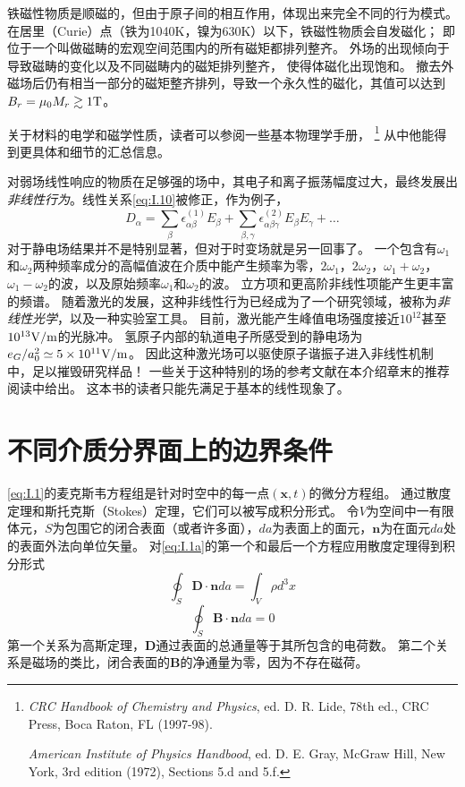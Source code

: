 \documentclass[12pt]{book}
\numberwithin{equation}{chapter}
\numberwithin{figure}{chapter}
\numberwithin{footnote}{page}
\begin{document}
铁磁性物质是顺磁的，但由于原子间的相互作用，体现出来完全不同的行为模式。
在居里（Curie）点（铁为1040K，镍为630K）以下，铁磁性物质会自发磁化；
即位于一个叫做磁畴的宏观空间范围内的所有磁矩都排列整齐。
外场的出现倾向于导致磁畴的变化以及不同磁畴内的磁矩排列整齐，
使得体磁化出现饱和。
撤去外磁场后仍有相当一部分的磁矩整齐排列，导致一个永久性的磁化，其值可以达到$B_r=\mu_0 M_r\gtrsim 1 {\rm T}$。

关于材料的电学和磁学性质，读者可以参阅一些基本物理学手册，
\footnote{\textit{CRC Handbook of Chemistry and Physics}, ed. D. R. Lide, 78th ed., CRC Press, Boca Raton, FL (1997-98).

\textit{American Institute of Physics Handbood}, ed. D. E. Gray, McGraw Hill, New York, 3rd edition (1972), Sections 5.d and 5.f.}
从中他能得到更具体和细节的汇总信息。

对弱场线性响应的物质在足够强的场中，其电子和离子振荡幅度过大，最终发展出\textit{非线性行为}。线性关系\autoref{eq:I.10}被修正，作为例子，
\begin{equation}\label{eq:I.12}
D_{\alpha}=\sum_{\beta}\epsilon_{\alpha\beta}^{(1)}E_{\beta}+\sum_{\beta,\gamma}\epsilon_{\alpha\beta\gamma}^{(2)}E_{\beta}E_{\gamma}+\dots
\end{equation}
对于静电场结果并不是特别显著，但对于时变场就是另一回事了。
一个包含有$\omega_1$和$\omega_2$两种频率成分的高幅值波在介质中能产生频率为零，$2\omega_1$，$2\omega_2$，$\omega_1+\omega_2$，$\omega_1-\omega_2$的波，以及原始频率$\omega_1$和$\omega_2$的波。
立方项和更高阶非线性项能产生更丰富的频谱。
随着激光的发展，这种非线性行为已经成为了一个研究领域，被称为\textit{非线性光学}，以及一种实验室工具。
目前，激光能产生峰值电场强度接近$10^{12}$甚至$10^{13}{\rm V/m}$的光脉冲。
氢原子内部的轨道电子所感受到的静电场为$e_G/a_0^2 \simeq 5\times 10^{11}{\rm V/m}$。
因此这种激光场可以驱使原子谐振子进入非线性机制中，足以摧毁研究样品！
一些关于这种特别的场的参考文献在本介绍章末的推荐阅读中给出。
这本书的读者只能先满足于基本的线性现象了。

\section{不同介质分界面上的边界条件}\label{sec:I.5}

\autoref{eq:I.1}的麦克斯韦方程组是针对时空中的每一点$(\mathbf{x},t)$的微分方程组。
通过散度定理和斯托克斯（Stokes）定理，它们可以被写成积分形式。
令$V$为空间中一有限体元，$S$为包围它的闭合表面（或者许多面），$da$为表面上的面元，$\mathbf{n}$为在面元$da$处的表面外法向单位矢量。
对\autoref{eq:I.1a}的第一个和最后一个方程应用散度定理得到积分形式
\begin{equation}\label{eq:I.13}
    \oint_S \mathbf{D}\cdot\mathbf{n} da=\int_V \rho d^3x
\end{equation}
\begin{equation}\label{eq:I.14}
    \oint_S \mathbf{B}\cdot\mathbf{n} da=0
\end{equation}
第一个关系为高斯定理，$\mathbf{D}$通过表面的总通量等于其所包含的电荷数。
第二个关系是磁场的类比，闭合表面的$\mathbf{B}$的净通量为零，因为不存在磁荷。
\end{document}
